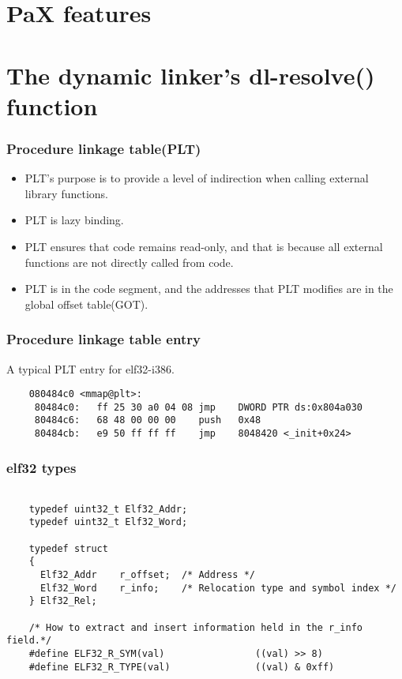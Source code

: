 \documentclass[10pt]{beamer}
\begin{document}
\section{PaX features}  %





\section{The dynamic linker's dl-resolve() function}  %

\begin{frame}[fragile]
\frametitle{Procedure linkage table(PLT)}

 \begin{itemize}
    \item PLT's purpose is to provide a level of indirection when calling external library functions.
    \item PLT is lazy binding.
    \item PLT ensures that code remains read-only, and that is because all external functions are not directly called from code.
    \item PLT is in the code segment, and the addresses that PLT modifies are in the global offset table(GOT).
  \end{itemize}

\end{frame}

\begin{frame}[fragile]
\frametitle{Procedure linkage table entry}
A typical PLT entry for elf32-i386.
	\begin{verbatim}
	080484c0 <mmap@plt>:
	 80484c0:	ff 25 30 a0 04 08 jmp    DWORD PTR ds:0x804a030
	 80484c6:	68 48 00 00 00    push   0x48
	 80484cb:	e9 50 ff ff ff    jmp    8048420 <_init+0x24>
	\end{verbatim}


\end{frame}

\begin{frame}[fragile]
\frametitle{elf32 types}

	\footnotesize
	\begin{verbatim}

	typedef uint32_t Elf32_Addr;
	typedef uint32_t Elf32_Word;

	typedef struct
	{
	  Elf32_Addr    r_offset;  /* Address */
	  Elf32_Word    r_info;    /* Relocation type and symbol index */
	} Elf32_Rel;

	/* How to extract and insert information held in the r_info field.*/
	#define ELF32_R_SYM(val)                ((val) >> 8)
	#define ELF32_R_TYPE(val)               ((val) & 0xff)
	\end{verbatim}
	\normalsize

\end{frame}
\end{document}
